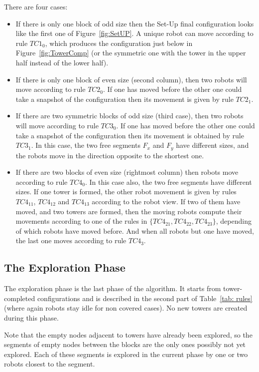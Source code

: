 There are four cases: 
\begin{itemize}
\item If there is only one block of odd size then the Set-Up final
  configuration looks like the first one of Figure~\ref{fig:SetUP}. A
  unique robot can move according to rule $TC1_0$, which produces the
  configuration just below in Figure~\ref{fig:TowerComp} (or the
  symmetric one with the tower in the upper half instead of the
  lower half).
\item If there is only one block of even size (second column), then
  two robots will move according to rule $TC2_0$. If one has moved
  before the other one could take a snapshot of the configuration then
  its movement is given by rule $TC2_1$.
\item If there are two symmetric blocks of odd size (third case), 
  then two robots will move according to rule $TC3_0$. If one has moved
  before the other one could take a snapshot of the configuration then
  its movement is obtained by rule $TC3_1$. In this case, the two free
  segments $F_x$ and $F_y$ have different sizes, and the robots move
  in the direction opposite to the shortest one.
\item If there are two blocks of even size (rightmost column) then
  robots move according to rule $TC4_0$. In this case also, the two
  free segments have different sizes.  If one tower is formed, the
  other robot movement is given by rules $TC4_{11}$, $TC4_{12}$ and
  $TC4_{13}$ according to the robot view.  If two of them have moved, 
  and two towers are formed, then the moving robots compute their
  movements according to one of the rules in $\{TC4_{21}, TC4_{22}, 
  TC4_{23}\}$, depending of which robots have moved before.  And when
  all robots but one have moved, the last one moves according to rule
  $TC4_3$.
\end{itemize}

\subsection{The Exploration Phase} \label{exp}
The exploration phase is the last phase of the algorithm. It starts
from tower-completed configurations and is described in the second part of
Table~\ref{tab: rules} (where again robots stay idle for non covered
cases). No new towers are created during this phase.


Note that the empty nodes adjacent to towers have already been
explored, so the segments of empty nodes between the blocks are the
only ones possibly not yet explored. Each of these segments is
explored in the current phase by one or two robots closest to the
segment.


